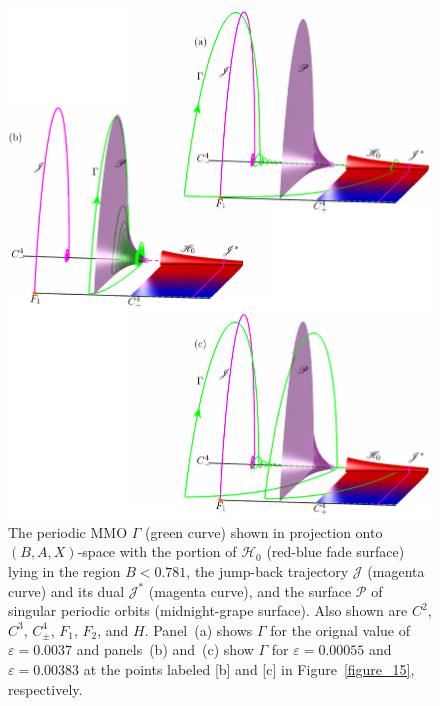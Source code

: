 \documentclass{ws-ijbc}
\begin{document}
\begin{figure}[t!]
\centering
\includegraphics[]{./figures/MKMO_16.pdf}
\caption{The periodic MMO $\Gamma$ (green curve) shown in projection onto $(B,A,X)$-space with the portion of $\mathscr{H}_0$ (red-blue fade surface) lying in the region $B<0.781$, the jump-back trajectory $\mathscr{J}$ (magenta curve) and its dual $\mathscr{J}^*$ (magenta curve), and the surface $\mathscr{P}$ of singular periodic orbits (midnight-grape surface).  Also shown are $C^2$, $C^3$, $C^4_\pm$, $F_1$, $F_2$, and $H$.  Panel~(a) shows $\Gamma$ for the orignal value of $\varepsilon=0.0037$ and panels~(b) and~(c) show $\Gamma$ for $\varepsilon=0.00055$ and $\varepsilon=0.00383$ at the points labeled [b] and [c] in Figure~\ref{figure_15}, respectively.}
\label{figure_16}
\end{figure}
\end{document}

